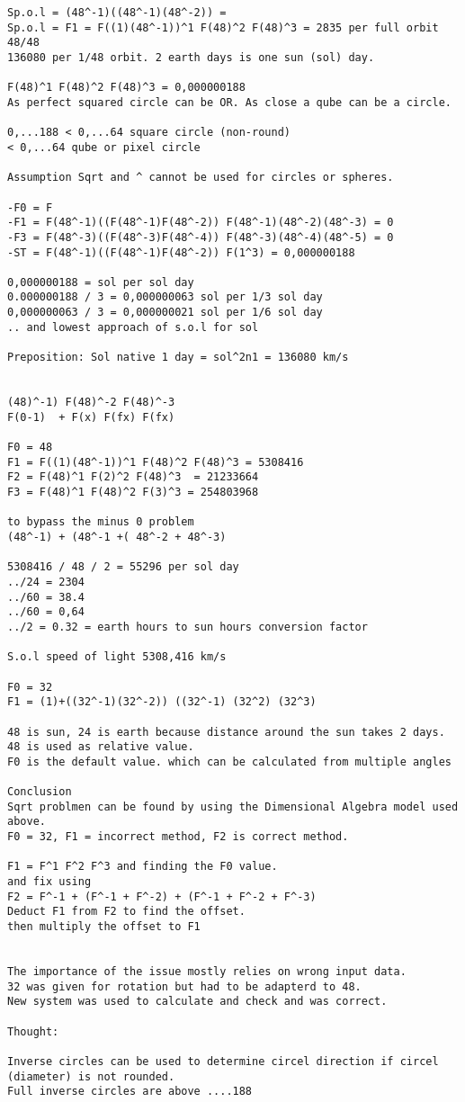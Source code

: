 \documentclass{thesis}
\begin{document}
\begin{verbatim}
Sp.o.l = (48^-1)((48^-1)(48^-2)) = 
Sp.o.l = F1 = F((1)(48^-1))^1 F(48)^2 F(48)^3 = 2835 per full orbit 48/48
136080 per 1/48 orbit. 2 earth days is one sun (sol) day.

F(48)^1 F(48)^2 F(48)^3 = 0,000000188 
As perfect squared circle can be OR. As close a qube can be a circle. 

0,...188 < 0,...64 square circle (non-round)
< 0,...64 qube or pixel circle

Assumption Sqrt and ^ cannot be used for circles or spheres.

-F0 = F
-F1 = F(48^-1)((F(48^-1)F(48^-2)) F(48^-1)(48^-2)(48^-3) = 0
-F3 = F(48^-3)((F(48^-3)F(48^-4)) F(48^-3)(48^-4)(48^-5) = 0
-ST = F(48^-1)((F(48^-1)F(48^-2)) F(1^3) = 0,000000188

0,000000188 = sol per sol day
0.000000188 / 3 = 0,000000063 sol per 1/3 sol day
0,000000063 / 3 = 0,000000021 sol per 1/6 sol day 
.. and lowest approach of s.o.l for sol

Preposition: Sol native 1 day = sol^2n1 = 136080 km/s   


(48)^-1) F(48)^-2 F(48)^-3 
F(0-1)  + F(x) F(fx) F(fx)

F0 = 48
F1 = F((1)(48^-1))^1 F(48)^2 F(48)^3 = 5308416
F2 = F(48)^1 F(2)^2 F(48)^3  = 21233664
F3 = F(48)^1 F(48)^2 F(3)^3 = 254803968

to bypass the minus 0 problem
(48^-1) + (48^-1 +( 48^-2 + 48^-3)

5308416 / 48 / 2 = 55296 per sol day
../24 = 2304
../60 = 38.4
../60 = 0,64
../2 = 0.32 = earth hours to sun hours conversion factor

S.o.l speed of light 5308,416 km/s

F0 = 32
F1 = (1)+((32^-1)(32^-2)) ((32^-1) (32^2) (32^3)

48 is sun, 24 is earth because distance around the sun takes 2 days.
48 is used as relative value. 
F0 is the default value. which can be calculated from multiple angles

Conclusion
Sqrt problmen can be found by using the Dimensional Algebra model used above.
F0 = 32, F1 = incorrect method, F2 is correct method. 

F1 = F^1 F^2 F^3 and finding the F0 value.
and fix using
F2 = F^-1 + (F^-1 + F^-2) + (F^-1 + F^-2 + F^-3)
Deduct F1 from F2 to find the offset. 
then multiply the offset to F1


The importance of the issue mostly relies on wrong input data.
32 was given for rotation but had to be adapterd to 48.
New system was used to calculate and check and was correct.

Thought:

Inverse circles can be used to determine circel direction if circel (diameter) is not rounded.
Full inverse circles are above ....188

\end{verbatim}
\end{document}
